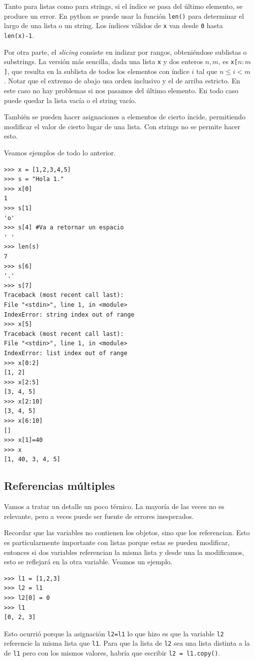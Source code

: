 \documentclass[a4paper, 12pt]{report}
\theoremstyle{definition}
\begin{document}
Tanto para listas como para strings, si el índice se pasa del último elemento, se produce un error. En python se puede usar la función {\tt len()} para determinar el largo de una lista o un string. Los índices válidos de {\tt x} van desde {\tt 0} hasta {\tt len(x)-1}.

Por otra parte, el {\sl slicing} consiste en indizar por rangos, obteniéndose sublistas o substrings. La versión más sencilla, dada una lista {\tt x} y dos enteros $n,m$, es {\tt x[$n:m$]}, que resulta en la sublista de todos los elementos con índice $i$ tal que $n\leq i < m$. Notar que el extremo de abajo usa orden inclusivo y el de arriba estricto. En este caso no hay problemas si nos pasamos del último elemento. En todo caso puede quedar la lista vacía o el string vacío.

También se pueden hacer asignaciones a elementos de cierto íncide, permitiendo modificar el valor de cierto lugar de una lista. Con strings no se permite hacer esto.

Veamos ejemplos de todo lo anterior.
\begin{verbatim}
>>> x = [1,2,3,4,5]
>>> s = "Hola 1."
>>> x[0]
1
>>> s[1]
'o'
>>> s[4] #Va a retornar un espacio
' '
>>> len(s)
7
>>> s[6]
'.'
>>> s[7]
Traceback (most recent call last):
File "<stdin>", line 1, in <module>
IndexError: string index out of range
>>> x[5]
Traceback (most recent call last):
File "<stdin>", line 1, in <module>
IndexError: list index out of range
>>> x[0:2]
[1, 2]
>>> x[2:5]
[3, 4, 5]
>>> x[2:10]
[3, 4, 5]
>>> x[6:10]
[]
>>> x[1]=40
>>> x
[1, 40, 3, 4, 5]
\end{verbatim}

\subsection{Referencias múltiples}\label{sec-memoriaCompartida}

Vamos a tratar un detalle un poco térnico. La mayoría de las veces no es relevante, pero a veces puede ser fuente de errores inesperados.

Recordar que las variables no contienen los objetos, sino que los referencian. Esto es particularmente importante con listas porque estas se pueden modificar, entonces si dos variables referencian la misma lista y desde una la modificamos, esto se reflejará en la otra variable. Veamos un ejemplo.
\begin{verbatim}
>>> l1 = [1,2,3]
>>> l2 = l1
>>> l2[0] = 0
>>> l1
[0, 2, 3]
\end{verbatim}
Esto ocurrió porque la asignación {\tt l2=l1} lo que hizo es que la variable {\tt l2} referencie la misma lista que {\tt l1}. Para que la lista de {\tt l2} sea una lista distinta a la de {\tt l1} pero con los mismos valores, habría que escribir {\tt l2 = l1.copy()}.
\end{document}
